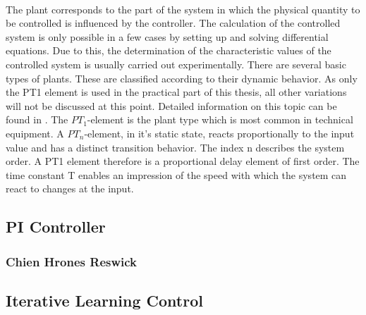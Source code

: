 \\The plant corresponds to the part of the system in which the physical quantity to be controlled is influenced by the controller. The calculation of the controlled system is only possible in a few cases by setting up and solving differential equations. Due to this, the determination of the characteristic values of the controlled system is usually carried out experimentally. There are several basic types of plants. These are classified according to their dynamic behavior. As only the PT1 element is used in the practical part of this thesis, all other variations will not be discussed at this point. Detailed information on this topic can be found in \cite{Reg_10}. The $PT_{1}$-element is the plant type which is most common in technical equipment.\cite{Reg_10} A $PT_{n}$-element, in it's static state, reacts proportionally to the input value and has a distinct transition behavior. The index n describes the system order.  A PT1 element therefore is a proportional delay element of first order. The time constant T enables an impression of the speed with which the system can react to changes at the input. 


\subsection{PI Controller}
\subsubsection{Chien Hrones Reswick}
\subsection{Iterative Learning Control}
